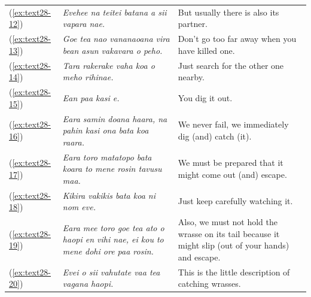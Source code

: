 \documentclass[output=paper]{langscibook}
\begin{document}
\begin{xltabular}{\textwidth}{lXX}
	(\ref{ex:text28-12})&\textit{Evehee na teitei batana a sii vapara nae.}&But usually there is also its partner.\\
	(\ref{ex:text28-13})&\textit{Goe tea nao vananaoana vira bean asun vakavara o peho.}&Don't go too far away when you have killed one.\\
	(\ref{ex:text28-14})&\textit{Tara rakerake vaha koa o meho rihinae.}&Just search for the other one nearby.\\
	(\ref{ex:text28-15})&\textit{Ean paa kasi e.}&You dig it out.\\
	(\ref{ex:text28-16})&\textit{Eara samin doana haara, na pahin kasi ona bata koa raara.}&We never fail, we immediately dig (and) catch (it).\\
	(\ref{ex:text28-17})&\textit{Eara toro matatopo bata koara to mene rosin tavusu maa.}&We must be prepared that it might come out (and) escape.\\
	(\ref{ex:text28-18})&\textit{Kikira vakikis bata koa ni nom eve.}&Just keep carefully watching it.\\
	(\ref{ex:text28-19})&\textit{Eara mee toro goe tea ato o haopi en vihi nae, ei kou to mene dohi ore paa rosin.}&Also, we must not hold the wrasse on its tail because it might slip (out of your hands) and escape. \\
	(\ref{ex:text28-20})&\textit{Evei o sii vahutate vaa tea vagana haopi.}&This is the little description of catching wrasses.\\
\end{xltabular}
\end{document}
